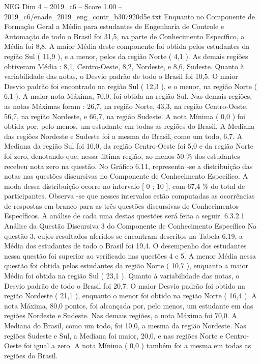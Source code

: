 \begin{textsample}{NEG Dim 4 – 2019\_c6 – Score 1.00 – 2019\_c6/enade\_2019\_eng\_contr\_b307920d5e.txt}
Enquanto no Componente de Formação Geral a Média para estudantes de Engenharia de Controle e Automação de todo o Brasil foi 31,5, na parte de Conhecimento Específico, a Média foi 8,8.
A maior Média deste componente foi obtida pelos estudantes da região Sul ( 11,9 ), e a menor, pelos da região Norte ( 4,1 ).
As demais regiões obtiveram Média : 8,1, Centro-Oeste, 8,2, Nordeste, e 8,6, Sudeste.
Quanto à variabilidade das notas, o Desvio padrão de todo o Brasil foi 10,5.
O maior Desvio padrão foi encontrado na região Sul ( 12,3 ), e o menor, na região Norte ( 6,1 ).
A maior nota Máxima, 70,0, foi obtida na região Sul.
Nas demais regiões, as notas Máximas foram : 26,7, na região Norte, 43,3, na região Centro-Oeste, 56,7, na região Nordeste, e 66,7, na região Sudeste.
A nota Mínima ( 0,0 ) foi obtida por, pelo menos, um estudante em todas as regiões do Brasil.
A Mediana das regiões Nordeste e Sudeste foi a mesma do Brasil, como um todo, 6,7.
A Mediana da região Sul foi 10,0, da região Centro-Oeste foi 5,0 e da região Norte foi zero, denotando que, nessa última região, ao menos 50 \% dos estudantes recebeu nota zero na questão.
No Gráfico 6.11, representa -se a distribuição das notas nas questões discursivas no Componente de Conhecimento Específico.
A moda dessa distribuição ocorre no intervalo [ 0 ; 10 ], com 67,4 \% do total de participantes.
Observa -se que nesses intervalos estão computadas as ocorrências de respostas em branco para as três questões discursivas de Conhecimentos Específicos.
A análise de cada uma destas questões será feita a seguir. 6.3.2.1 Análise da Questão Discursiva 3 do Componente de Conhecimento Específico Na questão 3, cujos resultados aferidos se encontram descritos na Tabela 6.19, a Média dos estudantes de todo o Brasil foi 19,4.
O desempenho dos estudantes nessa questão foi superior ao verificado nas questões 4 e 5.
A menor Média nessa questão foi obtida pelos estudantes da região Norte ( 10,7 ), enquanto a maior Média foi obtida na região Sul ( 23,1 ).
Quanto à variabilidade das notas, o Desvio padrão de todo o Brasil foi 20,7.
O maior Desvio padrão foi obtido na região Nordeste ( 21,1 ), enquanto o menor foi obtido na região Norte ( 16,4 ).
A nota Máxima, 80,0 pontos, foi alcançada por, pelo menos, um estudante em das regiões Nordeste e Sudeste.
Nas demais regiões, a nota Máxima foi 70,0.
A Mediana do Brasil, como um todo, foi 10,0, a mesma da região Nordeste.
Nas regiões Sudeste e Sul, a Mediana foi maior, 20,0, e nas regiões Norte e Centro-Oeste foi igual a zero.
A nota Mínima ( 0,0 ) também foi a mesma em todas as regiões do Brasil.

\end{textsample}
